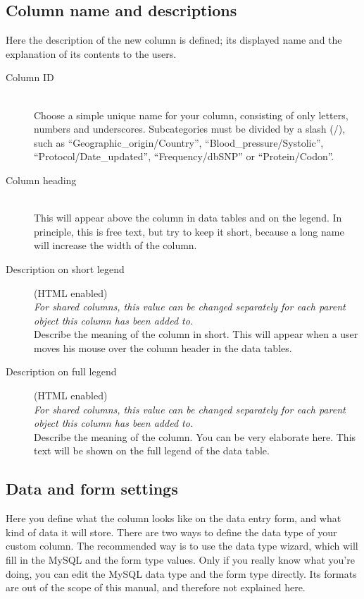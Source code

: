 \documentclass[a4paper,oneside,openany,12pt]{memoir}
\begin{document}
\subsection{Column name and descriptions}
Here the description of the new column is defined; its displayed name and the explanation of its contents to the users.
\begin{description}
  \item[Column ID] \hfill \\
  Choose a simple unique name for your column, consisting of only letters, numbers and underscores.
  Subcategories must be divided by a slash (/), such as ``Geographic\_origin\slash Country'', ``Blood\_pressure/Systolic'', ``Protocol/Date\_updated'', ``Frequency/dbSNP'' or ``Protein/Codon''.
  \item[Column heading] \hfill \\
  This will appear above the column in data tables and on the legend.
  In principle, this is free text, but try to keep it short, because a long name will increase the width of the column.
  \item[Description on short legend] (HTML enabled)\hfill \\
  \emph{For shared columns, this value can be changed separately for each parent object this column has been added to.}
  \\
  Describe the meaning of the column in short.
  This will appear when a user moves his mouse over the column header in the data tables.
  \item[Description on full legend] (HTML enabled)\hfill \\
  \emph{For shared columns, this value can be changed separately for each parent object this column has been added to.}
  \\
  Describe the meaning of the column.
  You can be very elaborate here.
  This text will be shown on the full legend of the data table.
\end{description}



\subsection{Data and form settings}
Here you define what the column looks like on the data entry form, and what kind of data it will store.
There are two ways to define the data type of your custom column.
The recommended way is to use the data type wizard, which will fill in the MySQL and the form type values.
Only if you really know what you're doing, you can edit the MySQL data type and the form type directly.
Its formats are out of the scope of this manual, and therefore not explained here.
\end{document}
